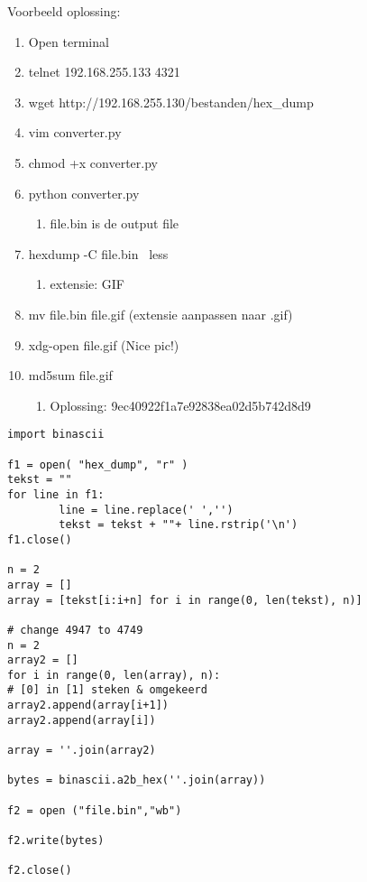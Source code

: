 Voorbeeld oplossing:
\begin{enumerate}
  \item Open terminal
  \item telnet 192.168.255.133 4321
  \item wget http://192.168.255.130/bestanden/hex\_dump
  \item vim converter.py
  \item chmod +x converter.py
  \item python converter.py
  \begin{enumerate}
  \item file.bin is de output file
  \end{enumerate}
  \item hexdump -C file.bin \textbar  ~less
  \begin{enumerate}
  \item extensie: GIF
  \end{enumerate}
  \item mv file.bin file.gif (extensie aanpassen naar .gif)
  \item xdg-open file.gif (Nice pic!)
  \item md5sum file.gif
  \begin{enumerate}
  \item Oplossing: 9ec40922f1a7e92838ea02d5b742d8d9
  \end{enumerate}
\end{enumerate}

\begin{lstlisting}
import binascii

f1 = open( "hex_dump", "r" )
tekst = ""
for line in f1:
        line = line.replace(' ','')
        tekst = tekst + ""+ line.rstrip('\n')
f1.close()

n = 2
array = []
array = [tekst[i:i+n] for i in range(0, len(tekst), n)]

# change 4947 to 4749
n = 2
array2 = []
for i in range(0, len(array), n):
# [0] in [1] steken & omgekeerd
array2.append(array[i+1])
array2.append(array[i])

array = ''.join(array2)

bytes = binascii.a2b_hex(''.join(array))

f2 = open ("file.bin","wb")

f2.write(bytes)

f2.close()
\end{lstlisting}